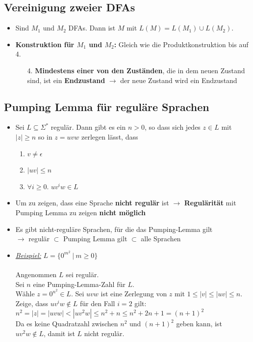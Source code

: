 \documentclass[ieeetran]{article}
\begin{document}
\subsection{Vereinigung zweier DFAs} %
\label{sub:vereinigung_zweier_dFAs}
\begin{itemize}
\item Sind $M_1$ und $M_2$ DFAs. Dann ist $M$ mit $L(M) = L(M_1) \cup L(M_2)$.
\item \textbf{Konstruktion für $M_1$ und $M_2$:}
Gleich wie die Produktkonstruktion bis auf 4.
\begin{enumerate}
	\item[4.] \textbf{Mindestens einer von den Zuständen}, die in dem neuen Zustand sind, ist ein \textbf{Endzustand} $\rightarrow$ der neue Zustand wird ein Endzustand
\end{enumerate}
\end{itemize}

\subsection{Pumping Lemma für reguläre Sprachen} %
\label{sub:pumping_lemma}
\begin{itemize}
	\item Sei $L \subseteq \Sigma^*$ regulär. Dann gibt es ein $n > 0$, so dass sich jedes $z \in L$ mit $|z| \ge n$ so in $z = uvw$ zerlegen lässt, dass
\begin{enumerate}
  \item $v \neq \epsilon$
\item $|uv| \le n$
\item $\forall i \ge 0.$ $uv^iw \in L$
\end{enumerate}
  \item Um zu zeigen, dass eine Sprache \textbf{nicht regulär} ist $\rightarrow$ \textbf{Regulärität} mit Pumping Lemma zu zeigen \textbf{nicht möglich}
  \item Es gibt nicht-reguläre Sprachen, für die das Pumping-Lemma gilt \\$\rightarrow$ regulär $\subset$ Pumping Lemma gilt $\subset$ alle Sprachen

  \item \textit{\underline{Beispiel:}} $L = \{0^{m^{2}} \ | \ m \ge 0\}$
\\ \\ Angenommen $L$ sei regulär.
\\Sei $n$ eine Pumping-Lemma-Zahl für $L$.
\\Wähle $z = 0^{n^{2}} \in L$. Sei $uvw$ ist eine Zerlegung von $z$ mit $1 \le |v| \le |uv| \le n$.
\\ Zeige, dass $uv^iw \not\in L$ für den Fall $i = 2$ gilt:
\\ $n^2 = |z| = |uvw| < |uv^2w| \le n^2 + n \le n^2 + 2n + 1 = (n + 1)^2$
\\ Da es keine Quadratzahl zwischen $n^2$ und $(n+1)^2$ geben kann, ist $uv^2w \not\in L$, damit ist $L$ nicht regulär.


\end{itemize}
\end{document}
